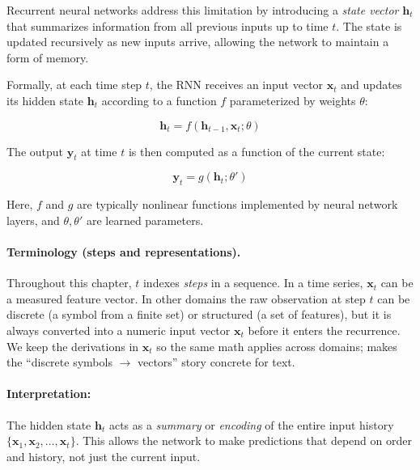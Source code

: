 Recurrent neural networks address this limitation by introducing a \emph{state vector} $\mathbf{h}_t$ that summarizes information from all previous inputs up to time $t$. The state is updated recursively as new inputs arrive, allowing the network to maintain a form of memory.

Formally, at each time step $t$, the RNN receives an input vector $\mathbf{x}_t$ and updates its hidden state $\mathbf{h}_t$ according to a function $f$ parameterized by weights $\theta$:

\begin{equation}
    \mathbf{h}_t = f(\mathbf{h}_{t-1}, \mathbf{x}_t; \theta)
    \label{eq:rnn_state_update_generic}
\end{equation}

The output $\mathbf{y}_t$ at time $t$ is then computed as a function of the current state:

\begin{equation}
    \mathbf{y}_t = g(\mathbf{h}_t; \theta')
    \label{eq:rnn_output}
\end{equation}

Here, $f$ and $g$ are typically nonlinear functions implemented by neural network layers, and $\theta, \theta'$ are learned parameters.

\paragraph{Terminology (steps and representations).}
Throughout this chapter, \(t\) indexes \emph{steps} in a sequence. In a time series, \(\mathbf{x}_t\) can be a measured feature vector. In other domains the raw observation at step \(t\) can be discrete (a symbol from a finite set) or structured (a set of features), but it is always converted into a numeric input vector \(\mathbf{x}_t\) before it enters the recurrence. We keep the derivations in \(\mathbf{x}_t\) so the same math applies across domains;  makes the ``discrete symbols \(\rightarrow\) vectors'' story concrete for text.

\paragraph{Interpretation:} The hidden state $\mathbf{h}_t$ acts as a \emph{summary} or \emph{encoding} of the entire input history $\{\mathbf{x}_1, \mathbf{x}_2, \ldots, \mathbf{x}_t\}$. This allows the network to make predictions that depend on order and history, not just the current input.

